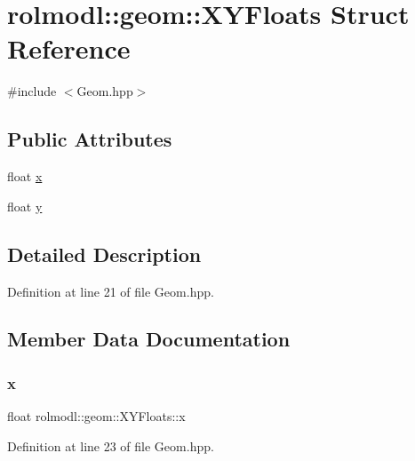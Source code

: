 \hypertarget{structrolmodl_1_1geom_1_1_x_y_floats}{}\section{rolmodl\+::geom\+::X\+Y\+Floats Struct Reference}
\label{structrolmodl_1_1geom_1_1_x_y_floats}


{\ttfamily \#include $<$Geom.\+hpp$>$}

\subsection*{Public Attributes}
\begin{DoxyCompactItemize}
\item 
float \mbox{\hyperlink{structrolmodl_1_1geom_1_1_x_y_floats_a62558508a990258f85138c8cebab82f3}{x}}
\item 
float \mbox{\hyperlink{structrolmodl_1_1geom_1_1_x_y_floats_a3f5e3217ec525f64bfb7d757a68d74b3}{y}}
\end{DoxyCompactItemize}


\subsection{Detailed Description}


Definition at line 21 of file Geom.\+hpp.



\subsection{Member Data Documentation}
\mbox{\label{structrolmodl_1_1geom_1_1_x_y_floats_a62558508a990258f85138c8cebab82f3}} 
\subsubsection{\texorpdfstring{x}{x}}
{\footnotesize\ttfamily float rolmodl\+::geom\+::\+X\+Y\+Floats\+::x}



Definition at line 23 of file Geom.\+hpp.

\mbox{\label{structrolmodl_1_1geom_1_1_x_y_floats_a3f5e3217ec525f64bfb7d757a68d74b3}} 
